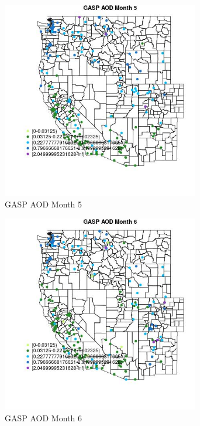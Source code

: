 \begin{figure} 
\centering  
\includegraphics[width=0.77\textwidth]{Code_Outputs/Report_ML_input_PM25_Step4_part_e_de_duplicated_aveswNAs_MapObsMo5GASP_AOD.jpg} 
\caption{\label{fig:Report_ML_input_PM25_Step4_part_e_de_duplicated_aveswNAsMapObsMo5GASP_AOD}GASP AOD Month 5} 
\end{figure} 
 

\begin{figure} 
\centering  
\includegraphics[width=0.77\textwidth]{Code_Outputs/Report_ML_input_PM25_Step4_part_e_de_duplicated_aveswNAs_MapObsMo6GASP_AOD.jpg} 
\caption{\label{fig:Report_ML_input_PM25_Step4_part_e_de_duplicated_aveswNAsMapObsMo6GASP_AOD}GASP AOD Month 6} 
\end{figure} 
 

